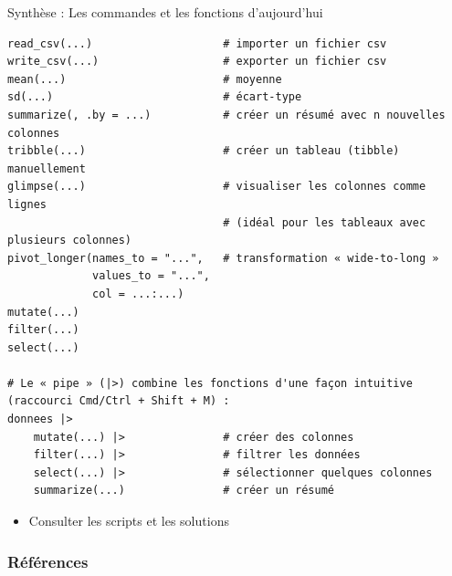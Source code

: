 \documentclass[xcolor=dvipsnames, mathserif, 10pt, aspectratio=169, handout]{beamer}
\begin{document}
\begin{frame}[fragile]{Synthèse : Les commandes et les fonctions d'aujourd'hui}

\begin{Verbatim}
read_csv(...)                    # importer un fichier csv
write_csv(...)                   # exporter un fichier csv
mean(...)                        # moyenne
sd(...)                          # écart-type
summarize(, .by = ...)           # créer un résumé avec n nouvelles colonnes
tribble(...)                     # créer un tableau (tibble) manuellement
glimpse(...)                     # visualiser les colonnes comme lignes 
                                 # (idéal pour les tableaux avec plusieurs colonnes)
pivot_longer(names_to = "...",   # transformation « wide-to-long »
             values_to = "...",
             col = ...:...)
mutate(...)
filter(...)
select(...)

# Le « pipe » (|>) combine les fonctions d'une façon intuitive (raccourci Cmd/Ctrl + Shift + M) :
donnees |>
    mutate(...) |>               # créer des colonnes
    filter(...) |>               # filtrer les données
    select(...) |>               # sélectionner quelques colonnes
    summarize(...)               # créer un résumé
\end{Verbatim}



\begin{itemize}
	\item[\winner] Consulter les scripts et les solutions  
\end{itemize}

\end{frame}


\appendix
\begin{frame}[allowframebreaks]

{
\footnotesize
        \frametitle{Références}
        
          

}

\end{frame}






%
%  
\end{document}
